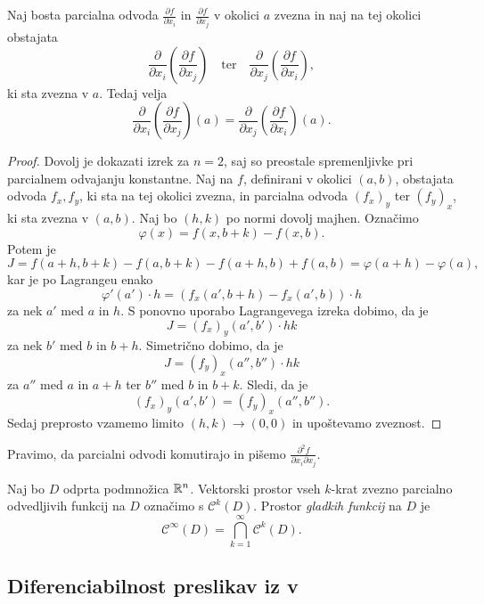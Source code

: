
\begin{izrek}
Naj bosta parcialna odvoda $\frac{\partial f}{\partial x_i}$ in
$\frac{\partial f}{\partial x_j}$ v okolici $a$ zvezna in naj na
tej okolici obstajata
\[
\frac{\partial}{\partial x_i}\left(
	\frac{\partial f}{\partial x_j}
\right)
\quad \text{ter} \quad
\frac{\partial}{\partial x_j}\left(
	\frac{\partial f}{\partial x_i}
\right),
\]
ki sta zvezna v $a$. Tedaj velja
\[
\frac{\partial}{\partial x_i}\left(
	\frac{\partial f}{\partial x_j}
\right)(a) =
\frac{\partial}{\partial x_j}\left(
	\frac{\partial f}{\partial x_i}
\right)(a).
\]
\end{izrek}

\begin{proof}
Dovolj je dokazati izrek za $n=2$, saj so preostale spremenljivke
pri parcialnem odvajanju konstantne. Naj na $f$, definirani v
okolici $(a,b)$, obstajata odvoda $f_x,f_y$, ki sta na tej okolici
zvezna, in parcialna odvoda $(f_x)_y$ ter $(f_y)_x$, ki sta zvezna
v $(a,b)$. Naj bo $(h,k)$ po normi dovolj majhen. Označimo
\[
\varphi(x) = f(x, b+k) - f(x, b).
\]
Potem je
\[
J =
f(a+h, b+k) - f(a, b+k) - f(a+h, b) + f(a, b) =
\varphi(a+h) - \varphi(a),
\]
kar je po Lagrangeu enako
\[
\varphi'(a') \cdot h = \left(
	f_x(a', b+h) - f_x(a', b)
\right) \cdot h
\]
za nek $a'$ med $a$ in $h$. S ponovno uporabo Lagrangevega izreka
dobimo, da je
\[
J = (f_x)_y(a', b')\cdot hk
\]
za nek $b'$ med $b$ in $b+h$. Simetrično dobimo, da je
\[
J = (f_y)_x(a'', b'')\cdot hk
\]
za $a''$ med $a$ in $a+h$ ter $b''$ med $b$ in $b+k$. Sledi, da je
\[
(f_x)_y(a', b') = (f_y)_x(a'', b'').
\]
Sedaj preprosto vzamemo limito $(h, k) \to (0, 0)$ in upoštevamo
zveznost.
\end{proof}

\begin{opomba}
Pravimo, da parcialni odvodi komutirajo in pišemo
$\frac{\partial^2 f}{\partial x_i\partial x_j}$.
\end{opomba}

\begin{definicija}
Naj bo $D$ odprta podmnožica $\mathbb{R}^n$. Vektorski prostor vseh
$k$-krat zvezno parcialno odvedljivih funkcij na $D$ označimo s
$\mathcal{C}^k(D)$. Prostor
\emph{gladkih funkcij} na $D$ je
\[
\mathcal{C}^\infty(D) = \bigcap_{k=1}^\infty \mathcal{C}^k(D).
\]
\end{definicija}

\newpage

\subsection{Diferenciabilnost preslikav iz  v }

